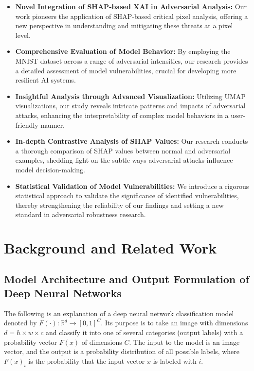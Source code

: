 \documentclass[10pt, conference, a4paper, final]{IEEEtran}
\begin{document}
\begin{itemize}
    \item \textbf{Novel Integration of SHAP-based XAI in Adversarial Analysis:} Our work pioneers the application of SHAP-based critical pixel analysis, offering a new perspective in understanding and mitigating these threats at a pixel level.
    
    \item \textbf{Comprehensive Evaluation of Model Behavior:} By employing the MNIST dataset across a range of adversarial intensities, our research provides a detailed assessment of model vulnerabilities, crucial for developing more resilient AI systems.
    
    \item \textbf{Insightful Analysis through Advanced Visualization:} Utilizing UMAP visualizations, our study reveals intricate patterns and impacts of adversarial attacks, enhancing the interpretability of complex model behaviors in a user-friendly manner.
    
    \item \textbf{In-depth Contrastive Analysis of SHAP Values:} Our research conducts a thorough comparison of SHAP values between normal and adversarial examples, shedding light on the subtle ways adversarial attacks influence model decision-making.
    
    \item \textbf{Statistical Validation of Model Vulnerabilities:} We introduce a rigorous statistical approach to validate the significance of identified vulnerabilities, thereby strengthening the reliability of our findings and setting a new standard in adversarial robustness research.

\end{itemize}

\section{Background and Related Work}

\subsection{Model Architecture and Output Formulation of Deep Neural Networks}



The following is an explanation of a deep neural network classification model denoted by \( F(\cdot) : \mathbb{R}^d \rightarrow [0, 1]^{C} \). Its purpose is to take an image with dimensions \( d = h \times w \times c \) and classify it into one of several categories (output labels) with a probability vector \( F(x) \) of dimensions \( C \). The input to the model is an image vector, and the output is a probability distribution of all possible labels, where \( F(x)_i \)  is the probability that the input vector \( x \)  is labeled with \( i \). 
\end{document}
